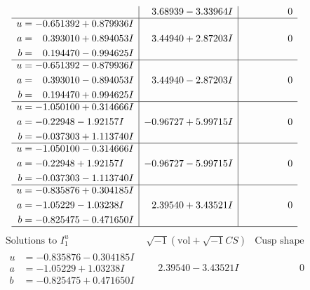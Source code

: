 \documentclass[1p]{elsarticle_modified}
\theoremstyle{definition}
\newcommand{\I}{\sqrt{-1}}
\begin{document}
$$\begin{array}{c|c|c}
 & \phantom{-}3.68939 - 3.33964 I & \phantom{-0.000000 } 0 \\ \hline\begin{aligned}
u &= -0.651392 + 0.879936 I \\
a &= \phantom{-}0.393010 + 0.894053 I \\
b &= \phantom{-}0.194470 - 0.994625 I\end{aligned}
 & \phantom{-}3.44940 + 2.87203 I & \phantom{-0.000000 } 0 \\ \hline\begin{aligned}
u &= -0.651392 - 0.879936 I \\
a &= \phantom{-}0.393010 - 0.894053 I \\
b &= \phantom{-}0.194470 + 0.994625 I\end{aligned}
 & \phantom{-}3.44940 - 2.87203 I & \phantom{-0.000000 } 0 \\ \hline\begin{aligned}
u &= -1.050100 + 0.314666 I \\
a &= -0.22948 - 1.92157 I \\
b &= -0.037303 + 1.113740 I\end{aligned}
 & -0.96727 + 5.99715 I & \phantom{-0.000000 } 0 \\ \hline\begin{aligned}
u &= -1.050100 - 0.314666 I \\
a &= -0.22948 + 1.92157 I \\
b &= -0.037303 - 1.113740 I\end{aligned}
 & -0.96727 - 5.99715 I & \phantom{-0.000000 } 0 \\ \hline\begin{aligned}
u &= -0.835876 + 0.304185 I \\
a &= -1.05229 - 1.03238 I \\
b &= -0.825475 - 0.471650 I\end{aligned}
 & \phantom{-}2.39540 + 3.43521 I & \phantom{-0.000000 } 0\\
 \hline 
 \end{array}$$\newpage$$\begin{array}{c|c|c}  
\text{Solutions to }I^u_{1}& \I (\text{vol} + \sqrt{-1}CS) & \text{Cusp shape}\\
 \hline 
\begin{aligned}
u &= -0.835876 - 0.304185 I \\
a &= -1.05229 + 1.03238 I \\
b &= -0.825475 + 0.471650 I\end{aligned}
 & \phantom{-}2.39540 - 3.43521 I & \phantom{-0.000000 } 0 \\ \hline\begin{aligned}

\end{aligned}
\end{array}$$
\end{document}
